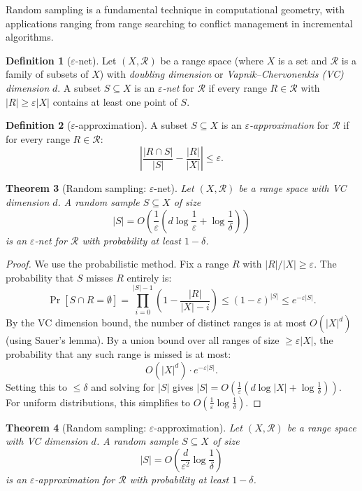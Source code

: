 \documentclass[twoside,12pt]{book}
\theoremstyle{plain}
\newtheorem{theorem}{Theorem}[chapter]
\theoremstyle{definition}
\newtheorem{definition}[theorem]{Definition}
\theoremstyle{remark}
\begin{document}
Random sampling is a fundamental technique in computational geometry, with applications ranging from range searching to conflict management in incremental algorithms.

\begin{definition}[$\varepsilon$-net]
Let $(X, \mathcal{R})$ be a range space (where $X$ is a set and $\mathcal{R}$ is a family of subsets of $X$) with \emph{doubling dimension} or \emph{Vapnik--Chervonenkis (VC) dimension} $d$. A subset $S \subseteq X$ is an \emph{$\varepsilon$-net} for $\mathcal{R}$ if every range $R \in \mathcal{R}$ with $|R| \geq \varepsilon |X|$ contains at least one point of $S$.
\end{definition}

\begin{definition}[$\varepsilon$-approximation]
A subset $S \subseteq X$ is an \emph{$\varepsilon$-approximation} for $\mathcal{R}$ if for every range $R \in \mathcal{R}$:
\[
\left| \frac{|R \cap S|}{|S|} - \frac{|R|}{|X|} \right| \leq \varepsilon.
\]
\end{definition}

\begin{theorem}[Random sampling: $\varepsilon$-net]
\label{thm:eps-net}
Let $(X, \mathcal{R})$ be a range space with VC dimension $d$. A random sample $S \subseteq X$ of size
\[
|S| = O\!\left(\frac{1}{\varepsilon} \left(d \log \frac{1}{\varepsilon} + \log \frac{1}{\delta}\right)\right)
\]
is an $\varepsilon$-net for $\mathcal{R}$ with probability at least $1 - \delta$.
\end{theorem}

\begin{proof}
We use the probabilistic method. Fix a range $R$ with $|R|/|X| \geq \varepsilon$. The probability that $S$ misses $R$ entirely is:
\[
\Pr[S \cap R = \emptyset] = \prod_{i=0}^{|S|-1} \left(1 - \frac{|R|}{|X| - i}\right) \leq \left(1 - \varepsilon\right)^{|S|} \leq e^{-\varepsilon |S|}.
\]
By the VC dimension bound, the number of distinct ranges is at most $O(|X|^d)$ (using Sauer's lemma). By a union bound over all ranges of size $\geq \varepsilon |X|$, the probability that any such range is missed is at most:
\[
O(|X|^d) \cdot e^{-\varepsilon |S|}.
\]
Setting this to $\leq \delta$ and solving for $|S|$ gives $|S| = O(\frac{1}{\varepsilon}(d \log |X| + \log \frac{1}{\delta}))$. For uniform distributions, this simplifies to $O(\frac{1}{\varepsilon} \log \frac{1}{\delta})$.
\end{proof}

\begin{theorem}[Random sampling: $\varepsilon$-approximation]
\label{thm:eps-approx}
Let $(X, \mathcal{R})$ be a range space with VC dimension $d$. A random sample $S \subseteq X$ of size
\[
|S| = O\!\left(\frac{d}{\varepsilon^2} \log \frac{1}{\delta}\right)
\]
is an $\varepsilon$-approximation for $\mathcal{R}$ with probability at least $1 - \delta$.
\end{theorem}
\end{document}
